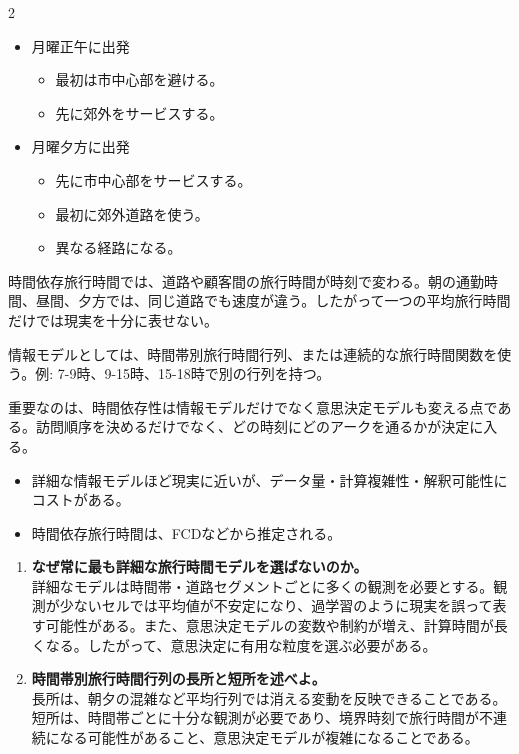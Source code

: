 \clearpage
{}
\begin{multicols}{2}\footnotesize\raggedcolumns
{}
\begin{itemize}
\item 月曜正午に出発
\begin{itemize}
\item 最初は市中心部を避ける。
\item 先に郊外をサービスする。
\end{itemize}
\item 月曜夕方に出発
\begin{itemize}
\item 先に市中心部をサービスする。
\item 最初に郊外道路を使う。
\item 異なる経路になる。
\end{itemize}
\end{itemize}
時間依存旅行時間では、道路や顧客間の旅行時間が時刻で変わる。朝の通勤時間、昼間、夕方では、同じ道路でも速度が違う。したがって一つの平均旅行時間だけでは現実を十分に表せない。\par

情報モデルとしては、時間帯別旅行時間行列、または連続的な旅行時間関数を使う。例: 7-9時、9-15時、15-18時で別の行列を持つ。\par

重要なのは、時間依存性は情報モデルだけでなく意思決定モデルも変える点である。訪問順序を決めるだけでなく、どの時刻にどのアークを通るかが決定に入る。\par
{}
\begin{itemize}
\item 詳細な情報モデルほど現実に近いが、データ量・計算複雑性・解釈可能性にコストがある。
\item 時間依存旅行時間は、FCDなどから推定される。
\end{itemize}
\begin{enumerate}
\item \textbf{なぜ常に最も詳細な旅行時間モデルを選ばないのか。}\\詳細なモデルは時間帯・道路セグメントごとに多くの観測を必要とする。観測が少ないセルでは平均値が不安定になり、過学習のように現実を誤って表す可能性がある。また、意思決定モデルの変数や制約が増え、計算時間が長くなる。したがって、意思決定に有用な粒度を選ぶ必要がある。
\item \textbf{時間帯別旅行時間行列の長所と短所を述べよ。}\\長所は、朝夕の混雑など平均行列では消える変動を反映できることである。短所は、時間帯ごとに十分な観測が必要であり、境界時刻で旅行時間が不連続になる可能性があること、意思決定モデルが複雑になることである。
\end{enumerate}
\end{multicols}

